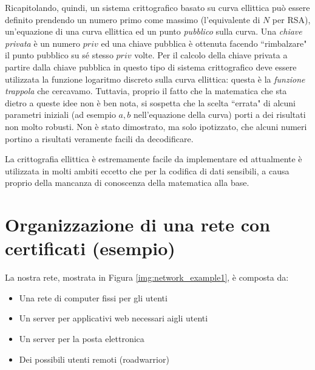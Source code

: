 Ricapitolando, quindi, un sistema crittografico basato su curva ellittica può essere definito prendendo un numero primo come massimo (l'equivalente di $N$ per RSA), un'equazione di una curva ellittica ed un punto \textit{pubblico} sulla curva. Una \textit{chiave privata} è un numero $priv$ ed una chiave pubblica è ottenuta facendo \textquotedblleft rimbalzare" il punto pubblico su sé stesso $priv$ volte. Per il calcolo della chiave privata a partire dalla chiave pubblica in questo tipo di sistema crittografico deve essere utilizzata la funzione logaritmo discreto sulla curva ellittica: questa è la \textit{funzione trappola} che cercavamo. Tuttavia, proprio il fatto che la matematica che sta dietro a queste idee non è ben nota, si sospetta che la scelta \textquotedblleft errata" di alcuni parametri iniziali (ad esempio $a, b$ nell'equazione della curva) porti a dei risultati non molto robusti. Non è stato dimostrato, ma solo ipotizzato, che alcuni numeri portino a risultati veramente facili da decodificare.

La crittografia ellittica è estremamente facile da implementare ed attualmente è utilizzata in molti ambiti eccetto che per la codifica di dati sensibili, a causa proprio della mancanza di conoscenza della matematica alla base.

\newpage
\section{Organizzazione di una rete con certificati (esempio)}
La nostra rete, mostrata in Figura \ref{img:network_example1}, è composta da:
\begin{itemize}
\item Una rete di computer fissi per gli utenti
\item Un server per applicativi web necessari aigli utenti
\item Un server per la posta elettronica
\item Dei possibili utenti remoti (roadwarrior)
\end{itemize}

